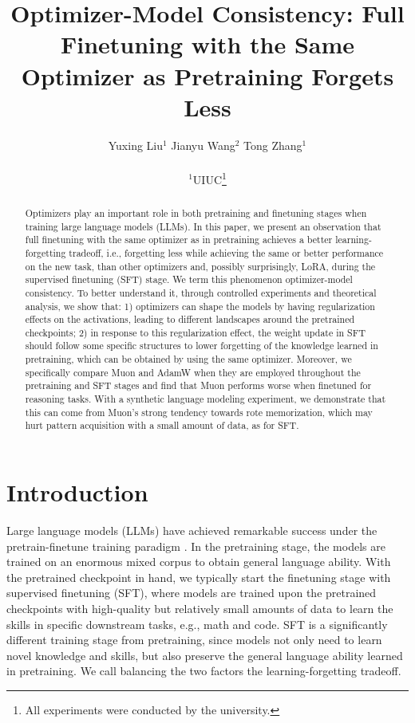 \documentclass{article}
\title{\textbf{Optimizer-Model Consistency: Full Finetuning with the Same Optimizer as Pretraining Forgets Less}}
\author{Yuxing Liu$^{1}$ \qquad Jianyu Wang$^{2}$ \qquad Tong Zhang$^{1}$ \\ \\
{
$^{1}$UIUC}\footnote{All experiments were conducted by the university.} 
\quad {$^{2}$Apple } 
}
\date{}
\theoremstyle{remark}
\begin{document}
\maketitle

\begin{abstract}
    \noindent
    Optimizers play an important role in both pretraining and finetuning stages when training large language models (LLMs). 
    In this paper, we present an observation that full finetuning with the same optimizer as in pretraining achieves a better learning-forgetting tradeoff, i.e., forgetting less while achieving the same or better performance on the new task, than other optimizers and, possibly surprisingly, LoRA, during the supervised finetuning (SFT) stage. We term this phenomenon optimizer-model consistency.
    To better understand it, through controlled experiments and theoretical analysis, we show that: 1) optimizers can shape the models by having regularization effects on the activations, leading to different landscapes around the pretrained checkpoints; 2) in response to this regularization effect, the weight update in SFT should follow some specific structures to lower forgetting of the knowledge learned in pretraining, which can be obtained by using the same optimizer.
    Moreover, we specifically compare Muon and AdamW when they are employed throughout the pretraining and SFT stages and find that Muon performs worse when finetuned for reasoning tasks. With a synthetic language modeling experiment, we demonstrate that this can come from Muon's strong tendency towards rote memorization, which may hurt pattern acquisition with a small amount of data, as for SFT.
\end{abstract}






\section{Introduction}


Large language models (LLMs) have achieved remarkable success under the pretrain-finetune training paradigm \citep{radford2019language,ouyang2022instructgpt,grattafiori2024llama,yang2025qwen3}. In the pretraining stage, the models are trained on an enormous mixed corpus to obtain general language ability.
With the pretrained checkpoint in hand, we typically start the finetuning stage with supervised finetuning (SFT), where models are trained upon the pretrained checkpoints with high-quality but relatively small amounts of data to learn the skills in specific downstream tasks, e.g., math and code.
SFT is a significantly different training stage from pretraining, since models not only need to learn novel knowledge and skills, but also preserve the general language ability learned in pretraining. We call balancing the two factors the learning-forgetting tradeoff.
\end{document}
